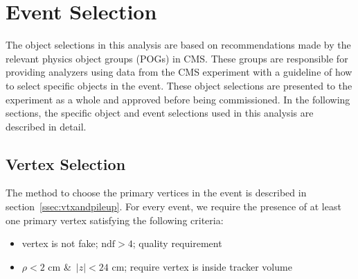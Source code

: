 \section{Event Selection}
The object selections in this analysis are based on recommendations made by the relevant physics object groups (POGs) in CMS.
These groups are responsible for providing analyzers using data from the CMS experiment with a guideline of how to select specific objects in the event.
These object selections are presented to the experiment as a whole and approved before being commissioned.
In the following sections, the specific object and event selections used in this analysis are described in detail.

\subsection{Vertex Selection}
The method to choose the primary vertices in the event is described in section~\ref{ssec:vtxandpileup}.
For every event, we require the presence of at least one primary vertex satisfying the following criteria:

\begin{itemize}
\item vertex is not fake; $\mathrm{ndf}>4$; quality requirement
\item $\rho<2$ cm \&\ $|z|<24$ cm; require vertex is inside tracker volume
\end{itemize}

